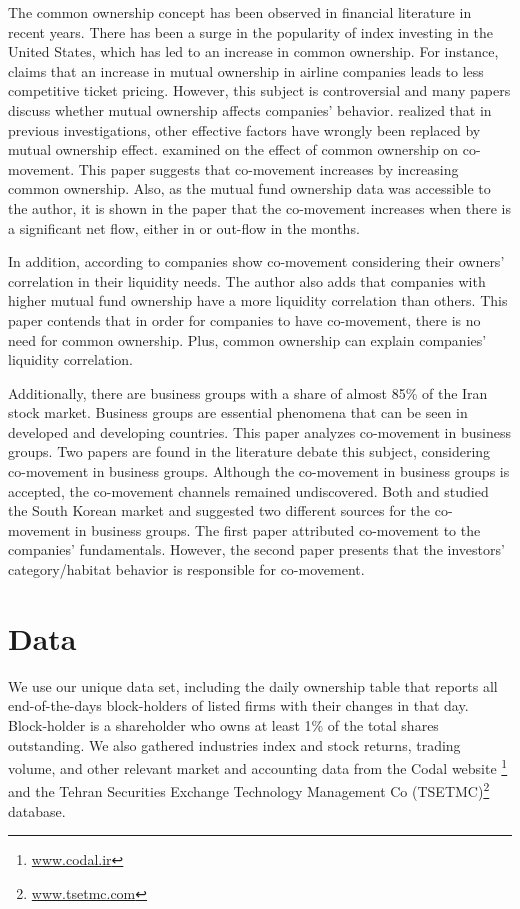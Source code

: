 \documentclass[12pt, a4paper]{article}
\begin{document}
	The common ownership concept has been observed in financial literature in recent years. There has been a surge in the popularity of index investing in the United States, which has led to an increase in common ownership. 
			For instance, \cite{azar2018anticompetitive} claims that an increase in mutual ownership in airline companies leads to less competitive ticket pricing. However, this subject is controversial and many papers discuss whether mutual ownership affects companies' behavior. \cite{lewellen2021does} realized that in previous investigations, other effective factors have wrongly been replaced by mutual ownership effect.
		{\cite{AntonPolk}} examined on the effect of common ownership on co-movement. 
	This paper suggests that co-movement increases by increasing common ownership. Also, as the mutual fund ownership data was accessible to the author, it is shown in the paper that the  co-movement increases when there is a significant net flow, either in or out-flow in the months.
	
	In addition, according to {\cite{Liquidity2016}} companies show co-movement considering their owners' correlation in their liquidity needs. The author also adds that companies with higher mutual fund ownership have a more liquidity correlation than others. This paper contends that in order for companies to have co-movement, there is no need for common ownership. Plus, common ownership can explain companies'  liquidity correlation. 
	
			
Additionally, there are business groups with a share of almost 85\% of the Iran stock market. Business groups are essential phenomena that can be seen in developed and developing countries. 
This paper analyzes co-movement in business groups. Two papers are found in the literature debate this subject, considering co-movement in business groups.
Although the co-movement in business groups is accepted, the co-movement channels remained undiscovered.
Both {\cite{cho2015stock} and \cite{kim2015stock}} studied the South Korean market and suggested two different sources for the co-movement in business groups. The first paper attributed co-movement to the companies' fundamentals. However, the second paper presents that the investors' category/habitat behavior is responsible for co-movement.
		
\section*{Data}
We  use our unique data set, including the daily ownership table that reports all end-of-the-days block-holders of listed firms with their changes in that day.  Block-holder is a shareholder who owns at least 1\% of the total shares outstanding. 
	We also gathered industries index and stock returns, trading volume, and other relevant market and accounting data from the Codal website \footnote{\href{http://www.codal.ir}{www.codal.ir}}
and the  Tehran Securities Exchange Technology Management Co (TSETMC)\footnote{\href{http://www.tsetmc.com}{www.tsetmc.com}} database.
\end{document}
